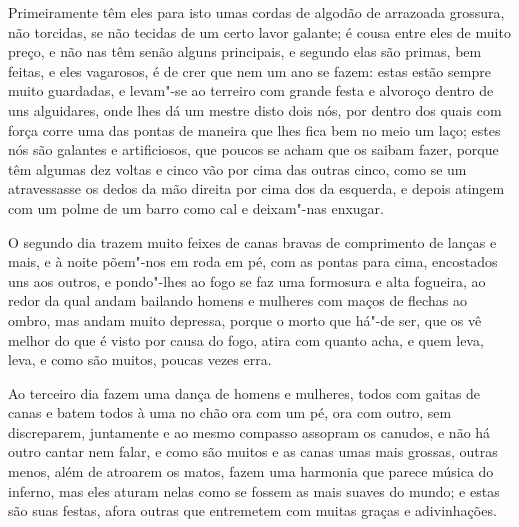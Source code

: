 \begin{linenumbers}
 Primeiramente têm eles para isto umas cordas de algodão de arrazoada
grossura, não torcidas, se não tecidas de um certo lavor galante; é
cousa entre eles de muito preço, e não nas têm senão alguns principais,
e segundo elas são primas, bem feitas, e eles vagarosos, é de crer que
nem um ano se fazem: estas estão sempre muito guardadas, e levam"-se ao
terreiro com grande festa e alvoroço dentro de uns alguidares, onde
lhes dá um mestre disto dois nós, por dentro dos quais com força corre
uma das pontas de maneira que lhes fica bem no meio um laço; estes nós
são galantes e artificiosos, que poucos se acham que os saibam fazer,
porque têm algumas dez voltas e cinco vão por cima das outras cinco,
como se um atravessasse os dedos da mão direita por cima dos da
esquerda, e depois atingem com um polme de um barro como cal e
deixam"-nas enxugar.

 O segundo dia trazem muito feixes de canas bravas de comprimento de 
lanças e mais, e à noite põem"-nos em roda em pé, com as pontas para
cima, encostados uns aos outros, e pondo"-lhes ao fogo se faz uma
formosura e alta fogueira, ao redor da qual andam bailando homens e
mulheres com maços de flechas ao ombro, mas andam muito depressa,
porque o morto que há"-de ser, que os vê melhor do que é visto por causa
do fogo, atira com quanto acha, e quem leva, leva, e como são muitos,
poucas vezes erra.

 Ao terceiro dia fazem uma dança de homens e mulheres, todos com gaitas
de canas e batem todos à uma no chão ora com um pé, ora com outro, sem
discreparem, juntamente e ao mesmo compasso assopram os canudos, e não
há outro cantar nem falar, e como são muitos e as canas umas mais
grossas, outras menos, além de atroarem os matos, fazem uma harmonia
que parece música do inferno, mas eles aturam nelas como se fossem as
mais suaves do mundo; e estas são suas festas, afora outras que
entremetem com muitas graças e adivinhações.


\end{linenumbers}
